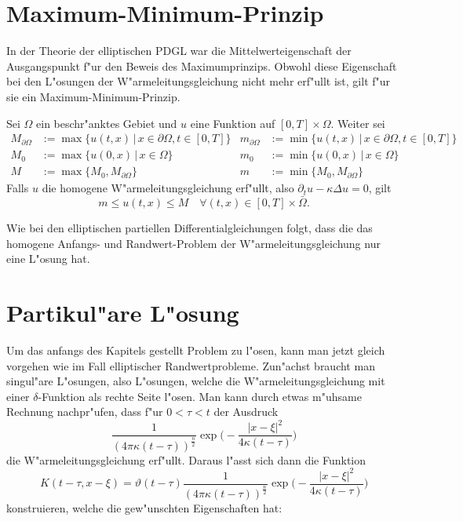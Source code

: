 \section{Maximum-Minimum-Prinzip}
In der Theorie der elliptischen PDGL war die Mittelwerteigenschaft
der Ausgangspunkt f"ur den Beweis des Maximumprinzips. Obwohl
diese Eigenschaft bei den 
L"osungen der W"armeleitungsgleichung nicht mehr erf"ullt ist,
gilt f"ur sie ein Maximum-Minimum-Prinzip.
\begin{satz}
Sei $\Omega$ ein beschr"anktes Gebiet und
$u$ eine Funktion auf $[0,T]\times\Omega$.
Weiter sei
\begin{align*}
M_{\partial \Omega}&:=\max\{u(t,x)\,|\,x\in\partial\Omega, t\in[0,T]\}
&
m_{\partial \Omega}&:=\min\{u(t,x)\,|\,x\in\partial\Omega, t\in[0,T]\}
\\
M_0&:=
\max\{u(0,x)\,|\,x\in\Omega\}
&
m_0&:=
\min\{u(0,x)\,|\,x\in\Omega\}
\\
M&:=\max\{M_0,M_{\partial\Omega}\}
&
m&:=\min\{M_0,M_{\partial\Omega}\}
\end{align*}
Falls $u$ die homogene
W"armeleitungsgleichung erf"ullt, also $\partial_tu-\kappa\Delta u=0$,
gilt
\[
m\le u(t,x)\le M\quad\forall(t,x)\in[0,T]\times\bar\Omega.
\]
\end{satz}
Wie bei den elliptischen partiellen Differentialgleichungen folgt, dass
die das homogene Anfangs- und Randwert-Problem der W"armeleitungsgleichung
nur eine L"osung hat.

\section{Partikul"are L"osung}
Um das anfangs des Kapitels gestellt Problem zu l"osen, kann man jetzt
gleich vorgehen wie im Fall elliptischer Randwertprobleme. Zun"achst
braucht man singul"are L"osungen, also L"osungen, welche die
W"armeleitungsgleichung mit einer $\delta$-Funktion als rechte Seite
l"osen.
Man kann durch etwas m"uhsame Rechnung nachpr"ufen, dass f"ur $0<\tau<t$
der Ausdruck
\[
\frac1{(4\pi\kappa(t-\tau))^{\frac{n}2}}
\exp\biggl(-\frac{|x-\xi|^2}{4\kappa(t-\tau)}\biggr)
\]
die W"armeleitungsgleichung erf"ullt. Daraus l"asst sich
dann die Funktion
\begin{equation}
K(t-\tau, x-\xi)
=
\vartheta(t-\tau)
\frac1{(4\pi\kappa(t-\tau))^{\frac{n}2}}
\exp\biggl(-\frac{|x-\xi|^2}{4\kappa(t-\tau)}\biggr)
\label{parabolischsingulaer}
\end{equation}
konstruieren, welche die gew"unschten Eigenschaften hat:

